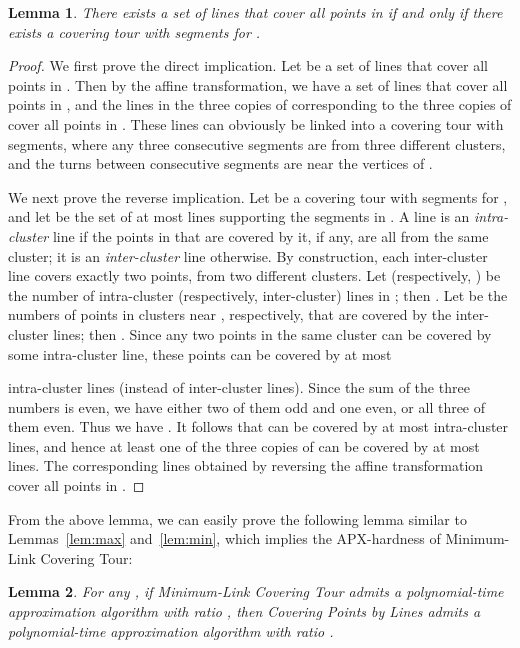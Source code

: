 \documentclass[letterpaper,11pt]{article}
\newtheorem{lemma}{Lemma}
\begin{document}
\begin{lemma}
There exists a set of  lines that cover all points in 
if and only if
there exists a covering tour with  segments for .
\end{lemma}
\begin{proof}
We first prove the direct implication.
Let  be a set of  lines that cover all points in .
Then by the affine transformation,
we have a set  of  lines that cover all points in ,
and the  lines in the three copies of 
corresponding to the three copies of  cover all points in .
These  lines can obviously be linked into a covering tour
with  segments,
where any three consecutive segments are from three different clusters,
and the turns between consecutive segments are near the vertices of .

We next prove the reverse implication.
Let  be a covering tour with  segments for ,
and let  be the set of at most  lines
supporting the  segments in .
A line is an \emph{intra-cluster} line if the points in  that are covered
by it, if any, are all from the same cluster;
it is an \emph{inter-cluster} line otherwise.
By construction,
each inter-cluster line covers exactly two points, from two different clusters.
Let  (respectively, ) be the number of
intra-cluster (respectively, inter-cluster) lines in ;
then .
Let  be the numbers of points in clusters near ,
respectively, that are covered by the inter-cluster lines;
then .
Since any two points in the same cluster can be covered by some intra-cluster
line, these  points can be covered by at most

intra-cluster lines (instead of  inter-cluster lines).
Since the sum of the three numbers  is even,
we have either two of them odd and one even, or all three of them even.
Thus we have
.
It follows that  can be covered by at most 
intra-cluster lines, and hence at least one of the three copies of 
can be covered by at most  lines.
The corresponding  lines obtained by reversing the affine transformation
cover all points in .
\end{proof}

From the above lemma, we can easily prove the following lemma similar to
Lemmas~\ref{lem:max} and~\ref{lem:min},
which implies the APX-hardness of {\sc Minimum-Link Covering Tour}:

\begin{lemma}\label{lem:covering}
For any ,
if {\sc Minimum-Link Covering Tour} admits a polynomial-time approximation algorithm
with ratio ,
then {\sc Covering Points by Lines} admits a polynomial-time approximation algorithm
with ratio .
\end{lemma}
\end{document}
